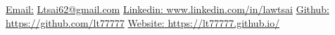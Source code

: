 \documentclass[UTF8]{resume} %
\begin{document}
  \scriptsize\underline{Email:}
            \href{Ltsai62@gmail.com}{Ltsai62@gmail.com}     {  }
            {\scriptsize\underline{Linkedin:}}\href{https://www.linkedin.com/in/lawtsai}{ www.linkedin.com/in/lawtsai}
            {        }
           {\scriptsize\underline{Github:}}\href{https://github.com/lt77777}{ https://github.com/lt77777}
           {        }
           {\scriptsize\underline{Website:}}\href{https://lt77777.github.io/}{ https://lt77777.github.io/}\\ \\
~\vspace{-0.2cm}
\end{document}
